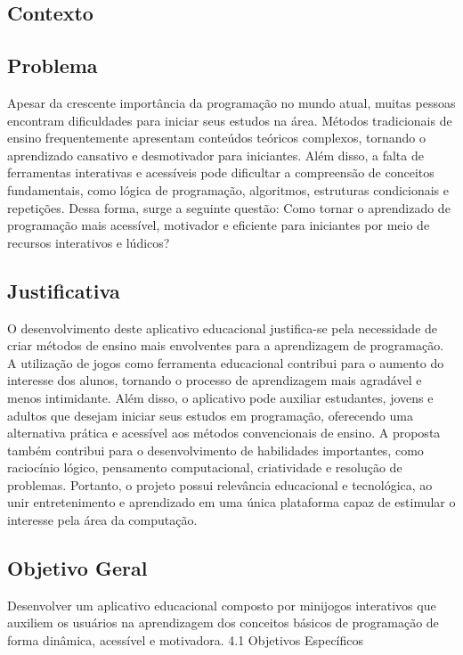 \documentclass{article}
\begin{document}
\subsection{Contexto}

\subsection{Problema}
Apesar da crescente importância da programação no mundo atual, muitas pessoas encontram dificuldades para iniciar seus estudos na área. Métodos tradicionais de ensino frequentemente apresentam conteúdos teóricos complexos, tornando o aprendizado cansativo e desmotivador para iniciantes.
Além disso, a falta de ferramentas interativas e acessíveis pode dificultar a compreensão de conceitos fundamentais, como lógica de programação, algoritmos, estruturas condicionais e repetições. Dessa forma, surge a seguinte questão:
Como tornar o aprendizado de programação mais acessível, motivador e eficiente para iniciantes por meio de recursos interativos e lúdicos?

\subsection{Justificativa}
O desenvolvimento deste aplicativo educacional justifica-se pela necessidade de criar métodos de ensino mais envolventes para a aprendizagem de programação. A utilização de jogos como ferramenta educacional contribui para o aumento do interesse dos alunos, tornando o processo de aprendizagem mais agradável e menos intimidante.
Além disso, o aplicativo pode auxiliar estudantes, jovens e adultos que desejam iniciar seus estudos em programação, oferecendo uma alternativa prática e acessível aos métodos convencionais de ensino. A proposta também contribui para o desenvolvimento de habilidades importantes, como raciocínio lógico, pensamento computacional, criatividade e resolução de problemas.
Portanto, o projeto possui relevância educacional e tecnológica, ao unir entretenimento e aprendizado em uma única plataforma capaz de estimular o interesse pela área da computação.

\subsection{Objetivo Geral}
Desenvolver um aplicativo educacional composto por minijogos interativos que auxiliem os usuários na aprendizagem dos conceitos básicos de programação de forma dinâmica, acessível e motivadora.
4.1 Objetivos Específicos
\end{document}

